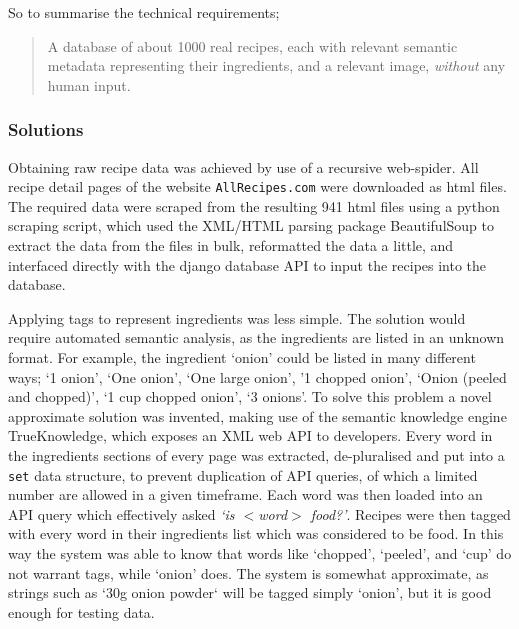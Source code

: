 So to summarise the technical requirements;

\begin{quotation}
A database of about 1000 real recipes, each with relevant semantic metadata representing their ingredients, and a relevant image, \textit{without} any human input.
\end{quotation}

\subsubsection{Solutions}

Obtaining raw recipe data was achieved by use of a recursive web-spider. All recipe detail pages of the website \texttt{AllRecipes.com} were downloaded as html files. The required data were scraped from the resulting 941 html files using a python scraping script, which used the XML/HTML parsing package BeautifulSoup to extract the data from the files in bulk, reformatted the data a little, and interfaced directly with the django database API to input the recipes into the database.

Applying tags to represent ingredients was less simple. The solution would require automated semantic analysis, as the ingredients are listed in an unknown format. For example, the ingredient `onion' could be listed in many different ways; `1 onion', `One onion', `One large onion', '1 chopped onion', `Onion (peeled and chopped)', `1 cup chopped onion', `3 onions'. To solve this problem a novel approximate solution was invented, making use of the semantic knowledge engine TrueKnowledge, which exposes an XML web API to developers. Every word in the ingredients sections of every page was extracted, de-pluralised and put into a \texttt{set} data structure, to prevent duplication of API queries, of which a limited number are allowed in a given timeframe. Each word was then loaded into an API query which effectively asked \textit{`is $<$word$>$ food?'}. Recipes were then tagged with every word in their ingredients list which was considered to be food. In this way the system was able to know that words like `chopped', `peeled', and `cup' do not warrant tags, while `onion' does. The system is somewhat approximate, as strings such as `30g onion powder` will be tagged simply `onion', but it is good enough for testing data.

